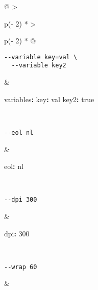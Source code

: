 \documentclass[
  a4paper,
]{article}
\newenvironment{Shaded}{}{}
\newcommand{\AttributeTok}[1]{\textcolor[rgb]{0.49,0.56,0.16}{#1}}
\newcommand{\CharTok}[1]{\textcolor[rgb]{0.25,0.44,0.63}{#1}}
\newcommand{\DecValTok}[1]{\textcolor[rgb]{0.25,0.63,0.44}{#1}}
\newcommand{\FunctionTok}[1]{\textcolor[rgb]{0.02,0.16,0.49}{#1}}
\newcommand{\KeywordTok}[1]{\textcolor[rgb]{0.00,0.44,0.13}{\textbf{#1}}}
\begin{document}
\begin{longtable}[]{@{}
  >{\raggedright\arraybackslash}p{(\columnwidth - 2\tabcolsep) * }
  >{\raggedright\arraybackslash}p{(\columnwidth - 2\tabcolsep) * }@{}}
\begin{minipage}[t]{\linewidth}
\begin{verbatim}
--variable key=val \
  --variable key2
\end{verbatim}
\end{minipage} & \begin{minipage}[t]{\linewidth}\raggedright
\begin{Shaded}
\begin{Highlighting}[]
\FunctionTok{variables}\KeywordTok{:}
\AttributeTok{  }\FunctionTok{key}\KeywordTok{:}\AttributeTok{ val}
\AttributeTok{  }\FunctionTok{key2}\KeywordTok{:}\AttributeTok{ }\CharTok{true}
\end{Highlighting}
\end{Shaded}
\end{minipage} \\
\begin{minipage}[t]{\linewidth}\raggedright
\begin{verbatim}
--eol nl
\end{verbatim}
\end{minipage} & \begin{minipage}[t]{\linewidth}\raggedright
\begin{Shaded}
\begin{Highlighting}[]
\FunctionTok{eol}\KeywordTok{:}\AttributeTok{ nl}
\end{Highlighting}
\end{Shaded}
\end{minipage} \\
\begin{minipage}[t]{\linewidth}\raggedright
\begin{verbatim}
--dpi 300
\end{verbatim}
\end{minipage} & \begin{minipage}[t]{\linewidth}\raggedright
\begin{Shaded}
\begin{Highlighting}[]
\FunctionTok{dpi}\KeywordTok{:}\AttributeTok{ }\DecValTok{300}
\end{Highlighting}
\end{Shaded}
\end{minipage} \\
\begin{minipage}[t]{\linewidth}\raggedright
\begin{verbatim}
--wrap 60
\end{verbatim}
\end{minipage} & \begin{minipage}[t]{\linewidth}\raggedright
\begin{Shaded}

\end{Shaded}
\end{minipage}
\end{longtable}
\end{document}
